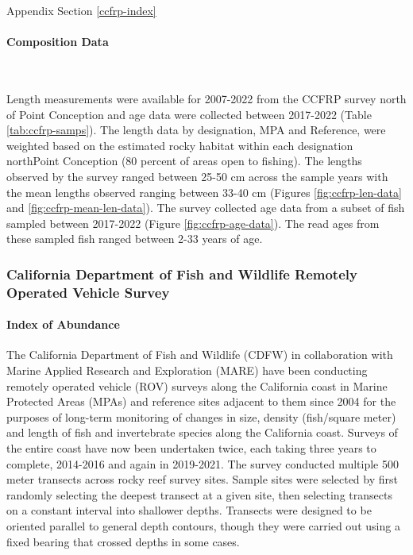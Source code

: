 \documentclass[11pt,
  english,
  letterpaper,
]{article}
\begin{document}
Appendix Section \ref{ccfrp-index}

\hypertarget{composition-data-2}{%
\paragraph{Composition Data}\label{composition-data-2}}

~

Length measurements were available for 2007-2022 from the CCFRP survey north of Point Conception and age data were collected between 2017-2022 (Table \ref{tab:ccfrp-samps}). The length data by designation, MPA and Reference, were weighted based on the estimated rocky habitat within each designation northPoint Conception (80 percent of areas open to fishing). The lengths observed by the survey ranged between 25-50 cm across the sample years with the mean lengths observed ranging between 33-40 cm (Figures \ref{fig:ccfrp-len-data} and \ref{fig:ccfrp-mean-len-data}). The survey collected age data from a subset of fish sampled between 2017-2022 (Figure \ref{fig:ccfrp-age-data}). The read ages from these sampled fish ranged between 2-33 years of age.

\hypertarget{california-department-of-fish-and-wildlife-remotely-operated-vehicle-survey}{%
\subsubsection{California Department of Fish and Wildlife Remotely Operated Vehicle Survey}\label{california-department-of-fish-and-wildlife-remotely-operated-vehicle-survey}}

\hypertarget{index-of-abundance-1}{%
\paragraph{Index of Abundance}\label{index-of-abundance-1}}

\hfill\break

The California Department of Fish and Wildlife (CDFW) in collaboration with Marine Applied Research and Exploration (MARE) have been conducting remotely operated vehicle (ROV) surveys along the California coast in Marine Protected Areas (MPAs) and reference sites adjacent to them since 2004 for the purposes of long-term monitoring of changes in size, density (fish/square meter) and length of fish and invertebrate species along the California coast. Surveys of the entire coast have now been undertaken twice, each taking three years to complete, 2014-2016 and again in 2019-2021. The survey conducted multiple 500 meter transects across rocky reef survey sites. Sample sites were selected by first randomly selecting the deepest transect at a given site, then selecting transects on a constant interval into shallower depths. Transects were designed to be oriented parallel to general depth contours, though they were carried out using a fixed bearing that crossed depths in some cases.
\end{document}
